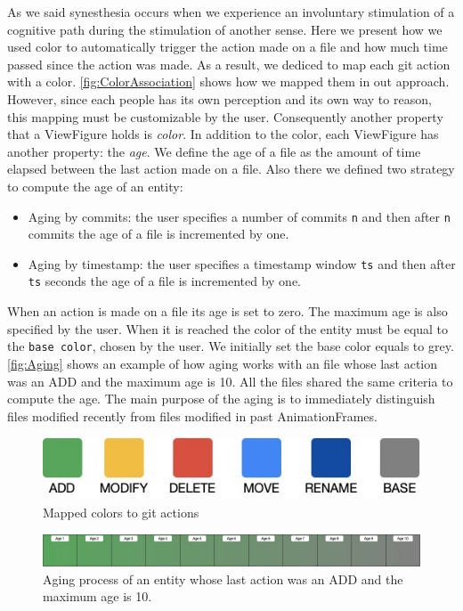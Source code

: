 As we said synesthesia occurs when we experience an involuntary stimulation of a cognitive path during the stimulation of another sense. Here we present how we used color to automatically trigger the action made on a file and how much time passed since the action was made. 
As a result, we dediced to map each git action with a color. \autoref{fig:ColorAssociation} shows how we mapped them in out approach. However, since each people has its own perception and its own way to reason, this mapping must be customizable by the user. Consequently another property that a ViewFigure holds is \textit{color}.
\bigbreak
In addition to the color, each ViewFigure has another property: the \textit{age}. We define the age of a file as the amount of time elapsed between the last action made on a file. Also there we defined two strategy to compute the age of an entity:

\begin{itemize}
    \item{Aging by commits}: the user specifies a number of commits \texttt{n} and then after \texttt{n} commits the age of a file is incremented by one. 
    \item{Aging by timestamp}:  the user specifies a timestamp window \texttt{ts} and then after \texttt{ts} seconds the age of a file is incremented by one.
\end{itemize}

When an action is made on a file its age is set to zero. 
\bigbreak
The maximum age is also specified by the user. When it is reached the color of the entity must be equal to the \texttt{base color}, chosen by the user. 
We initially set the base color equals to grey. \autoref{fig:Aging} shows an example of how aging works with an file whose last action was an ADD and the maximum age is 10. 
\bigbreak
All the files shared the same criteria to compute the age. The main purpose of the aging is to immediately distinguish files modified recently from files modified in past AnimationFrames.

\begin{figure}
    \center
    \includegraphics[width=0.\textwidth]{ColorMapping.jpg}
    \caption{Mapped colors to git actions}
    \label{fig:ColorAssociation}
\end{figure}


\begin{figure}
    \center
    \includegraphics[width=\textwidth]{Aging.jpg}
    \caption{Aging process of an entity whose last action was an ADD and the maximum age is 10. }
    \label{fig:Aging}
\end{figure}



